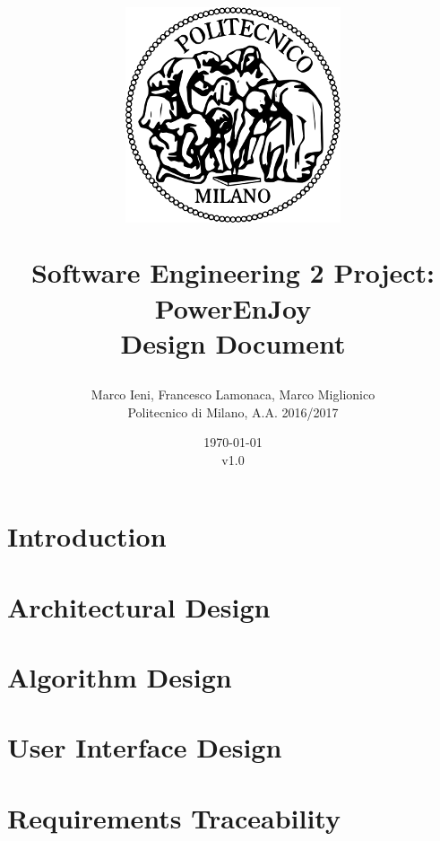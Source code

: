 \documentclass[a4paper, 12pt]{report}
\title{
	\begin{figure}[h]
		\centering
		\includegraphics{../common_resources/logo_polimi.png}
	\end{figure}
	\vspace{30px}
	Software Engineering 2 Project: PowerEnJoy \\ \vspace{1em}
	\textbf{D}esign \textbf{D}ocument
}
\author{Marco Ieni, Francesco Lamonaca, Marco Miglionico\\Politecnico di Milano, A.A. 2016/2017}
\date{\today\\v1.0}
\begin{document}
\maketitle
\tableofcontents

\chapter{Introduction}
\label{ch:introduction}






\chapter{Architectural Design}
\label{ch:architectural_design}









\chapter{Algorithm Design}
\label{ch:algorithm_design}


\chapter{User Interface Design}
\label{ch:ui_design}



\chapter{Requirements Traceability}
\label{ch:requirements_traceability}
\end{document}
